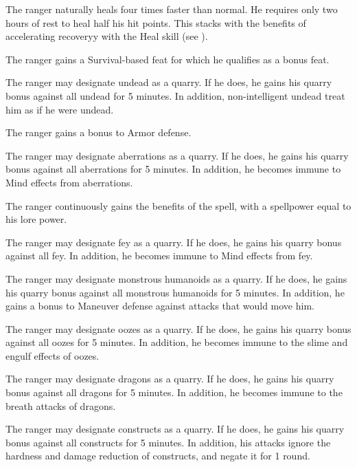 The ranger naturally heals four times faster than normal.
He requires only two hours of rest to heal half his hit points.
This stacks with the benefits of accelerating recoveryy with the Heal skill (see ).

The ranger gains a Survival-based feat for which he qualifies as a bonus feat.

The ranger may designate undead as a quarry.
If he does, he gains his quarry bonus against all undead for 5 minutes.
In addition, non-intelligent undead treat him as if he were undead.

The ranger gains a  bonus to Armor defense.

The ranger may designate aberrations as a quarry.
If he does, he gains his quarry bonus against all aberrations for 5 minutes.
In addition, he becomes immune to Mind effects from aberrations.

The ranger continuously gains the benefits of the  spell, with a spellpower equal to his lore power.

The ranger may designate fey as a quarry.
If he does, he gains his quarry bonus against all fey.
In addition, he becomes immune to Mind effects from fey.

The ranger may designate monstrous humanoids as a quarry.
If he does, he gains his quarry bonus against all monstrous humanoids for 5 minutes.
In addition, he gains a  bonus to Maneuver defense against attacks that would move him.

The ranger may designate oozes as a quarry.
If he does, he gains his quarry bonus against all oozes for 5 minutes.
In addition, he becomes immune to the slime and engulf effects of oozes.

The ranger may designate dragons as a quarry.
If he does, he gains his quarry bonus against all dragons for 5 minutes.
In addition, he becomes immune to the breath attacks of dragons.

The ranger may designate constructs as a quarry.
If he does, he gains his quarry bonus against all constructs for 5 minutes.
In addition, his attacks ignore the hardness and damage reduction of constructs, and negate it for 1 round.

